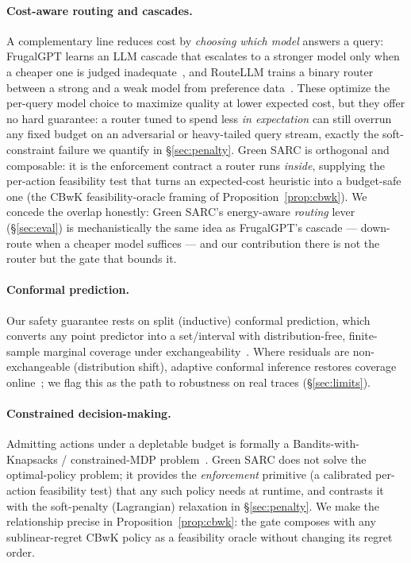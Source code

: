 \documentclass[11pt]{article}
\theoremstyle{plain}
\theoremstyle{definition}
\theoremstyle{remark}
\begin{document}
\paragraph{Cost-aware routing and cascades.} A complementary line reduces cost by \emph{choosing which model} answers a query: FrugalGPT learns an LLM cascade that escalates to a stronger model only when a cheaper one is judged inadequate~\cite{frugalgpt}, and RouteLLM trains a binary router between a strong and a weak model from preference data~\cite{routellm}. These optimize the per-query model choice to maximize quality at lower expected cost, but they offer no hard guarantee: a router tuned to spend less \emph{in expectation} can still overrun any fixed budget on an adversarial or heavy-tailed query stream, exactly the soft-constraint failure we quantify in \S\ref{sec:penalty}. Green SARC is orthogonal and composable: it is the enforcement contract a router runs \emph{inside}, supplying the per-action feasibility test that turns an expected-cost heuristic into a budget-safe one (the CBwK feasibility-oracle framing of Proposition~\ref{prop:cbwk}). We concede the overlap honestly: Green SARC's energy-aware \emph{routing} lever (\S\ref{sec:eval}) is mechanistically the same idea as FrugalGPT's cascade --- down-route when a cheaper model suffices --- and our contribution there is not the router but the gate that bounds it.

\paragraph{Conformal prediction.} Our safety guarantee rests on split (inductive) conformal prediction, which converts any point predictor into a set/interval with distribution-free, finite-sample marginal coverage under exchangeability~\cite{vovk2005,angelopoulos2023}. Where residuals are non-exchangeable (distribution shift), adaptive conformal inference restores coverage online~\cite{gibbs2021}; we flag this as the path to robustness on real traces (\S\ref{sec:limits}).

\paragraph{Constrained decision-making.} Admitting actions under a depletable budget is formally a Bandits-with-Knapsacks / constrained-MDP problem~\cite{cbwk}. Green SARC does not solve the optimal-policy problem; it provides the \emph{enforcement} primitive (a calibrated per-action feasibility test) that any such policy needs at runtime, and contrasts it with the soft-penalty (Lagrangian) relaxation in \S\ref{sec:penalty}. We make the relationship precise in Proposition~\ref{prop:cbwk}: the gate composes with any sublinear-regret CBwK policy as a feasibility oracle without changing its regret order.
\end{document}
